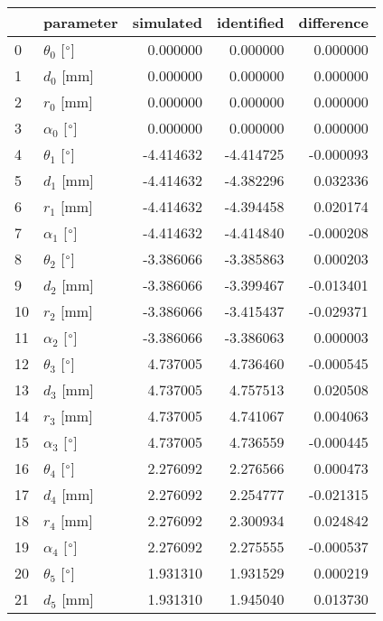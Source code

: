 \documentclass{standalone}%
\begin{document}
%
\normalsize%
\begin{tabular}{llrrr}
\toprule
{} &                 parameter & simulated & identified & difference \\
\midrule
0  &  $\theta_{0}$ [$\degree$] &  0.000000 &   0.000000 &   0.000000 \\
1  &              $d_{0}$ [mm] &  0.000000 &   0.000000 &   0.000000 \\
2  &              $r_{0}$ [mm] &  0.000000 &   0.000000 &   0.000000 \\
3  &  $\alpha_{0}$ [$\degree$] &  0.000000 &   0.000000 &   0.000000 \\
4  &  $\theta_{1}$ [$\degree$] & -4.414632 &  -4.414725 &  -0.000093 \\
5  &              $d_{1}$ [mm] & -4.414632 &  -4.382296 &   0.032336 \\
6  &              $r_{1}$ [mm] & -4.414632 &  -4.394458 &   0.020174 \\
7  &  $\alpha_{1}$ [$\degree$] & -4.414632 &  -4.414840 &  -0.000208 \\
8  &  $\theta_{2}$ [$\degree$] & -3.386066 &  -3.385863 &   0.000203 \\
9  &              $d_{2}$ [mm] & -3.386066 &  -3.399467 &  -0.013401 \\
10 &              $r_{2}$ [mm] & -3.386066 &  -3.415437 &  -0.029371 \\
11 &  $\alpha_{2}$ [$\degree$] & -3.386066 &  -3.386063 &   0.000003 \\
12 &  $\theta_{3}$ [$\degree$] &  4.737005 &   4.736460 &  -0.000545 \\
13 &              $d_{3}$ [mm] &  4.737005 &   4.757513 &   0.020508 \\
14 &              $r_{3}$ [mm] &  4.737005 &   4.741067 &   0.004063 \\
15 &  $\alpha_{3}$ [$\degree$] &  4.737005 &   4.736559 &  -0.000445 \\
16 &  $\theta_{4}$ [$\degree$] &  2.276092 &   2.276566 &   0.000473 \\
17 &              $d_{4}$ [mm] &  2.276092 &   2.254777 &  -0.021315 \\
18 &              $r_{4}$ [mm] &  2.276092 &   2.300934 &   0.024842 \\
19 &  $\alpha_{4}$ [$\degree$] &  2.276092 &   2.275555 &  -0.000537 \\
20 &  $\theta_{5}$ [$\degree$] &  1.931310 &   1.931529 &   0.000219 \\
21 &              $d_{5}$ [mm] &  1.931310 &   1.945040 &   0.013730 \\

\end{tabular}
\end{document}
